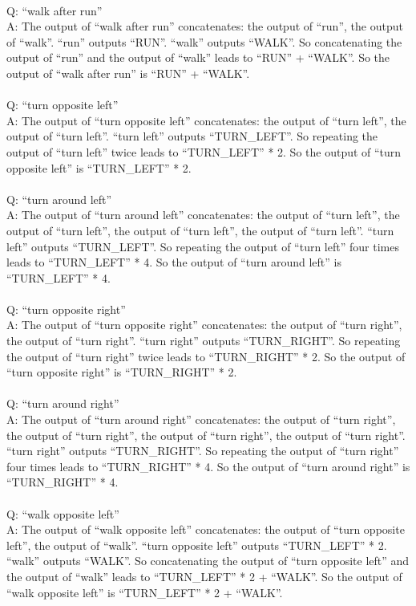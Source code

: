 { \\
Q: ``walk after run'' \\
A: The output of ``walk after run'' concatenates: the output of ``run'', the output of ``walk''. ``run'' outputs ``RUN''. ``walk'' outputs ``WALK''. So concatenating the output of ``run'' and the output of ``walk'' leads to ``RUN'' + ``WALK''. So the output of ``walk after run'' is ``RUN'' + ``WALK''. \\
 \\
Q: ``turn opposite left'' \\
A: The output of ``turn opposite left'' concatenates: the output of ``turn left'', the output of ``turn left''. ``turn left'' outputs ``TURN\_LEFT''. So repeating the output of ``turn left'' twice leads to ``TURN\_LEFT'' * 2. So the output of ``turn opposite left'' is ``TURN\_LEFT'' * 2. \\
 \\
Q: ``turn around left'' \\
A: The output of ``turn around left'' concatenates: the output of ``turn left'', the output of ``turn left'', the output of ``turn left'', the output of ``turn left''. ``turn left'' outputs ``TURN\_LEFT''. So repeating the output of ``turn left'' four times leads to ``TURN\_LEFT'' * 4. So the output of ``turn around left'' is ``TURN\_LEFT'' * 4. \\
 \\
Q: ``turn opposite right'' \\
A: The output of ``turn opposite right'' concatenates: the output of ``turn right'', the output of ``turn right''. ``turn right'' outputs ``TURN\_RIGHT''. So repeating the output of ``turn right'' twice leads to ``TURN\_RIGHT'' * 2. So the output of ``turn opposite right'' is ``TURN\_RIGHT'' * 2. \\
 \\
Q: ``turn around right'' \\
A: The output of ``turn around right'' concatenates: the output of ``turn right'', the output of ``turn right'', the output of ``turn right'', the output of ``turn right''. ``turn right'' outputs ``TURN\_RIGHT''. So repeating the output of ``turn right'' four times leads to ``TURN\_RIGHT'' * 4. So the output of ``turn around right'' is ``TURN\_RIGHT'' * 4. \\
 \\
Q: ``walk opposite left'' \\
A: The output of ``walk opposite left'' concatenates: the output of ``turn opposite left'', the output of ``walk''. ``turn opposite left'' outputs ``TURN\_LEFT'' * 2. ``walk'' outputs ``WALK''. So concatenating the output of ``turn opposite left'' and the output of ``walk'' leads to ``TURN\_LEFT'' * 2 + ``WALK''. So the output of ``walk opposite left'' is ``TURN\_LEFT'' * 2 + ``WALK''. \\
}
